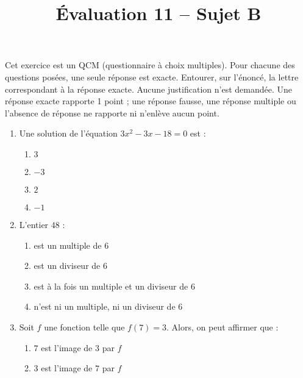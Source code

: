 \documentclass[a4paper,dvipsnames]{article}
\begin{document}
\title{Évaluation 11 -- Sujet B}
\author{}
\date{}

\maketitle{}

\pagestyle{empty}
\thispagestyle{empty}

\exo[4 points] Cet exercice est un QCM (questionnaire à choix multiples). Pour chacune des questions posées, une seule réponse est exacte. Entourer, sur l'énoncé, la lettre correspondant à la réponse exacte. Aucune justification n'est demandée. Une réponse exacte rapporte 1 point ; une réponse fausse, une réponse multiple ou l'absence de réponse ne rapporte ni n'enlève aucun point.

\begin{enumerate}
  \item Une solution de l'équation $3x^2-3x-18=0$ est :
    \vspace{-3mm}
    \begin{multicols}{4}
      \begin{enumerate}
	\item $3$
	\item $-3$
	\item $2$
	\item $-1$
      \end{enumerate} 
    \end{multicols}
  \item L'entier $48$ :
    \vspace{-3mm}
    \begin{multicols}{4}
      \begin{enumerate}
	\item est un multiple de $6$\columnbreak
	\item est un diviseur de $6$\columnbreak
	\item est à la fois un multiple et un diviseur de $6$
	\item n'est ni un multiple, ni un diviseur de $6$
      \end{enumerate} 
    \end{multicols}
  \item Soit $f$ une fonction telle que $f(7)=3$. Alors, on peut affirmer que :
    \begin{multicols}{4}
      \begin{enumerate}
	\item $7$ est l'image de $3$ par $f$
	\item $3$ est l'image de $7$ par $f$

\end{enumerate}
\end{multicols}
\end{enumerate}
\end{document}
